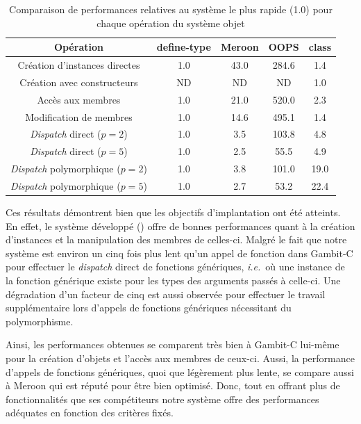 \documentclass[12pt,twoside,letterpaper,francais]{book}
\newcommand{\customizedTableName}{\textsc{Tableau}}
\newcommand{\ie}{{\textit{i.e.}~}}
\newcommand{\scheme}[1]{\selectlanguage{english}{\tt #1}\selectlanguage{french}}
\begin{document}
\renewcommand{\tablename}{\customizedTableName}
\begin{table}
  \center
  \begin{tabular}{ccccc}
    \hline
    Opération & define-type & Meroon & OOPS & class \\
    \hline \hline
    Création d'instances directes & 1.0 & 43.0 & 284.6 & 1.4 \\
    Création avec constructeurs & ND & ND & ND & 1.0 \\
    Accès aux membres & 1.0 & 21.0 & 520.0 & 2.3 \\
    Modification de membres & 1.0 & 14.6 & 495.1 & 1.4 \\
    \textit{Dispatch} direct ($p=2$) & 1.0 & 3.5 & 103.8 & 4.8 \\
    \textit{Dispatch} direct ($p=5$) & 1.0 & 2.5 & 55.5 & 4.9\\
    \textit{Dispatch} polymorphique ($p=2$) & 1.0 & 3.8 & 101.0 & 19.0\\
    \textit{Dispatch} polymorphique ($p=5$) & 1.0 & 2.7 & 53.2 & 22.4\\
    \hline
  \end{tabular}
  \caption{Comparaison de performances relatives au système le plus
    rapide (1.0) pour chaque opération du système objet}
  \label{OO:bench-rel}
\end{table}

Ces résultats démontrent bien que les objectifs d'implantation ont été
atteints. En effet, le système développé (\scheme{class}) offre de
bonnes performances quant à la création d'instances et la manipulation
des membres de celles-ci. Malgré le fait que notre système est environ
un cinq fois plus lent qu'un appel de fonction dans Gambit-C pour
effectuer le \textit{dispatch} direct de fonctions génériques, \ie où
une instance de la fonction générique existe pour les types des
arguments passés à celle-ci. Une dégradation d'un facteur de cinq est
aussi observée pour effectuer le travail supplémentaire lors d'appels
de fonctions génériques nécessitant du polymorphisme. 

Ainsi, les performances obtenues se comparent très bien à Gambit-C
lui-même pour la création d'objets et l'accès aux membres de
ceux-ci. Aussi, la performance d'appels de fonctions génériques, quoi
que légèrement plus lente, se compare aussi à Meroon qui est réputé
pour être bien optimisé. Donc, tout en offrant plus de fonctionnalités
que ses compétiteurs notre système offre des performances adéquates en
fonction des critères fixés.
\end{document}
